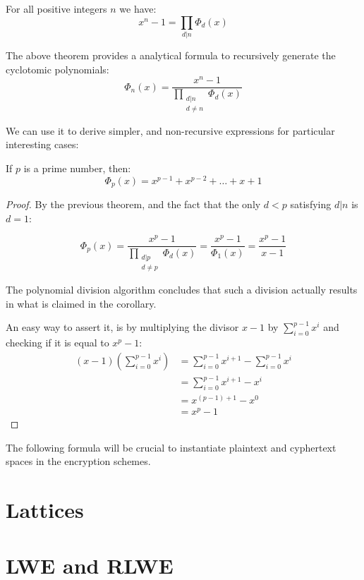 \begin{theorem} For all positive integers $n$ we have:
$$\displaystyle x^n-1=\prod_{d|n}\Phi_d(x)$$
\end{theorem}

The above theorem provides a analytical formula to recursively generate the cyclotomic polynomials:
$$\displaystyle\Phi_n(x)=\dfrac{x^n-1}{\displaystyle\prod_{\substack{d|n\\d\neq n}}\Phi_d(x)}$$

We can use it to derive simpler, and non-recursive expressions for particular interesting cases:

\begin{corollary}
If $p$ is a prime number, then:
$$\Phi_p(x)=x^{p-1}+x^{p-2}+\ldots+x+1$$
\end{corollary}

\begin{proof}
By the previous theorem, and the fact that the only $d<p$ satisfying $d|n$ is $d=1$:

$$\Phi_p(x)=\dfrac{x^p-1}{\displaystyle\prod_{\substack{d|p\\d\neq p}}\Phi_d(x)}=\dfrac{x^p-1}{\Phi_1(x)}=\dfrac{x^p-1}{x-1}$$

The polynomial division algorithm concludes that such a division actually results in what is claimed in the corollary.

An easy way to assert it, is by multiplying the divisor $x-1$ by $\displaystyle\sum_{i=0}^{p-1}x^i$ and checking if it is equal to $x^p-1$:
\begin{align*}
    (x-1)\left(\sum_{i=0}^{p-1}x^i\right)&=\sum_{i=0}^{p-1}x^{i+1}-\sum_{i=0}^{p-1}x^i\\
    &=\sum_{i=0}^{p-1}x^{i+1}-x^{i}\\
    &=x^{(p-1)+1}-x^{0}\\
    &=x^{p}-1
\end{align*}
\end{proof}
The following formula will be crucial to instantiate plaintext and cyphertext spaces in the encryption schemes.
\begin{corollary}

\end{corollary}
\section{Lattices}

\section{LWE and RLWE}

